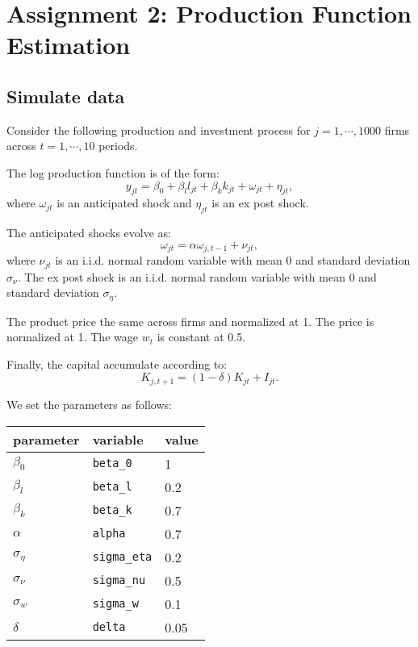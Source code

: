 \documentclass[
]{book}
\begin{document}
\hypertarget{assignment2}{%
\chapter{Assignment 2: Production Function Estimation}\label{assignment2}}

\hypertarget{simulate-data-1}{%
\section{Simulate data}\label{simulate-data-1}}

Consider the following production and investment process for \(j = 1, \cdots, 1000\) firms across \(t = 1, \cdots, 10\) periods.

The log production function is of the form:
\[
y_{jt} = \beta_0 + \beta_l l_{jt} + \beta_k k_{jt} + \omega_{jt} + \eta_{jt},
\]
where \(\omega_{jt}\) is an anticipated shock and \(\eta_{jt}\) is an ex post shock.

The anticipated shocks evolve as:
\[
\omega_{jt} = \alpha \omega_{j, t - 1} + \nu_{jt},
\]
where \(\nu_{jt}\) is an i.i.d. normal random variable with mean 0 and standard deviation \(\sigma_\nu\). The ex post shock is an i.i.d. normal random variable with mean 0 and standard deviation \(\sigma_{\eta}\).

The product price the same across firms and normalized at 1. The price is normalized at 1. The wage \(w_t\) is constant at 0.5.

Finally, the capital accumulate according to:
\[
K_{j, t + 1} = (1 - \delta) K_{jt} + I_{jt}.
\]

We set the parameters as follows:

\begin{longtable}[]{@{}lll@{}}
\toprule\noalign{}
parameter & variable & value \\
\midrule\noalign{}
\endhead
\bottomrule\noalign{}
\endlastfoot
\(\beta_0\) & \texttt{beta\_0} & 1 \\
\(\beta_l\) & \texttt{beta\_l} & 0.2 \\
\(\beta_k\) & \texttt{beta\_k} & 0.7 \\
\(\alpha\) & \texttt{alpha} & 0.7 \\
\(\sigma_{\eta}\) & \texttt{sigma\_eta} & 0.2 \\
\(\sigma_{\nu}\) & \texttt{sigma\_nu} & 0.5 \\
\(\sigma_{w}\) & \texttt{sigma\_w} & 0.1 \\
\(\delta\) & \texttt{delta} & 0.05 \\
\end{longtable}
\end{document}
